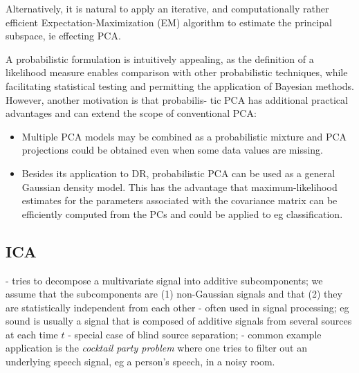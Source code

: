 \documentclass[journal, a4paper]{IEEEtran}
\begin{document}
Alternatively, it is natural to apply an iterative, and computationally rather efficient Expectation-Maximization (EM) algorithm to estimate the principal subspace, ie effecting PCA.


A probabilistic formulation is intuitively appealing, as the definition of a likelihood measure
enables comparison with other probabilistic techniques, while facilitating statistical testing and
permitting the application of Bayesian methods. However, another motivation is that probabilis-
tic PCA has additional practical advantages and can extend the scope of conventional PCA:
\begin{itemize}
	\item  Multiple PCA models may be combined as a probabilistic mixture and PCA projections could be obtained even when some data values are missing.
	\item Besides its application to DR, probabilistic PCA can be used as a general Gaussian density model. This has the advantage that maximum-likelihood estimates for the parameters associated with the covariance matrix can be efficiently computed from the PCs and could be applied to eg classification. 
\end{itemize}


\subsection{ICA}

- tries to decompose a multivariate signal into additive subcomponents;
we assume that the subcomponents are (1) non-Gaussian signals and that (2) they are statistically independent from each other
- often used in signal processing; eg sound is usually a signal that is composed of additive signals from several sources at each time \( t \)
- special case of blind source separation;
- common example application is the \textit{cocktail party problem} where one tries to filter out an underlying speech signal, eg a person's speech, in a noisy room. 

\end{document}
